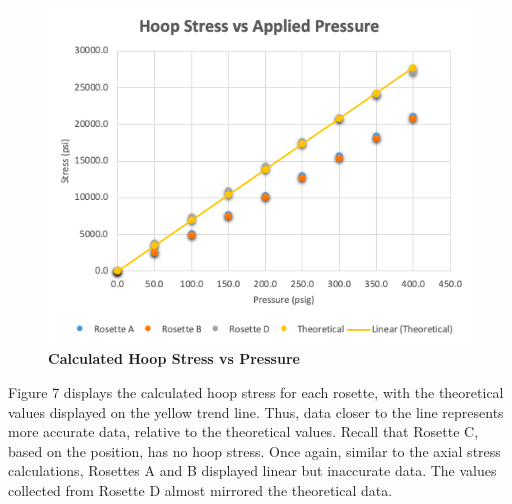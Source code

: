 \documentclass[12pt]{article}
\begin{document}
\begin{figure} [H]
	\centering
	\includegraphics [width=\textwidth]{plot_hoop_measured}
	\caption{ \textbf{Calculated Hoop Stress vs Pressure}}
\end{figure} 
Figure 7 displays the calculated hoop stress for each rosette, with the theoretical values 
displayed on the yellow trend line. Thus, data closer to the line represents more accurate data, relative to the theoretical values. Recall that Rosette C, based on the position, has no hoop stress.
Once again, similar to the axial stress calculations, Rosettes A and B displayed linear but inaccurate data. The values collected from Rosette D almost mirrored the theoretical data. 
\end{document}
